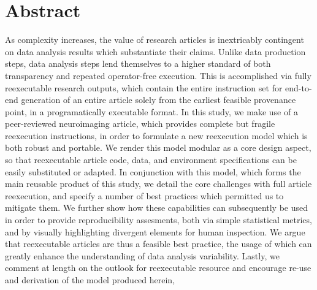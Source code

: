 \section{Abstract}

As complexity increases, the value of research articles is inextricably contingent on data analysis results which substantiate their claims.
Unlike data production steps, data analysis steps lend themselves to a higher standard of both transparency and repeated operator-free execution.
This is accomplished via fully reexecutable research outputs, which contain the entire instruction set for end-to-end generation of an entire article solely from the earliest feasible provenance point, in a programatically executable format.
In this study, we make use of a peer-reviewed neuroimaging article, which provides complete but fragile reexecution instructions, in order to formulate a new reexecution model which is both robust and portable.
We render this model modular as a core design aspect, so that reexecutable article code, data, and environment specifications can be easily substituted or adapted.
In conjunction with this model, which forms the main reusable product of this study, we detail the core challenges with full article reexecution, and specify a number of best practices which permitted us to mitigate them.
We further show how these capabilities can subsequently be used in order to provide reproducibility assesments, both via simple statistical metrics, and by visually highlighting divergent elements for human inspection.
We argue that reexecutable articles are thus a feasible best practice, the usage of which can greatly enhance the understanding of data analysis variability.
Lastly, we comment at length on the outlook for reexecutable resource and encourage re-use and derivation of the model produced herein, 


